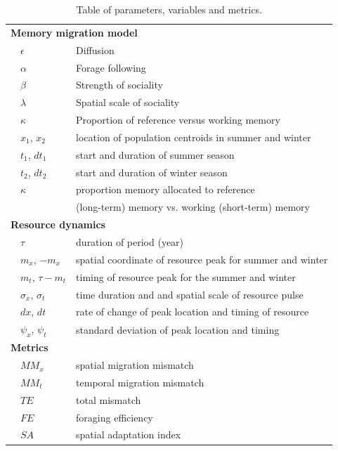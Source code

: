 \documentclass[12pt]{article}
\begin{document}
\begin{table}[b!]
	\caption{\label{tab_defs} Table of parameters, variables and metrics.}
	
	\centering
	\begin{tabular}{ll|l}
		\hline\hline
		\multicolumn{3}{l}{\textbf{Memory migration model}}\\ 
		& $\epsilon$ & Diffusion \\ 
		& $\alpha$ & Forage following \\ 
		& $\beta$ & Strength of sociality \\ 
		& $\lambda$ & Spatial scale of sociality \\ 
		& $\kappa$ & Proportion of reference versus working memory \\ 
		& $x_1$, $x_2$ & location of population centroids in summer and winter \\ 
		& $t_1$, $dt_1$ & start and duration of summer season \\ 
		& $t_2$, $dt_2$ & start and duration of winter season \\ 
		& $\kappa$ & proportion memory allocated to reference \\
		&& (long-term) memory vs. working (short-term) memory \\ 
		\multicolumn{3}{l}{\textbf{Resource dynamics}} \\ 
		& $\tau$ & duration of period (year) \\ 
		& $m_x$, $-m_x$ & spatial coordinate of resource peak for summer and winter \\ 
		& $m_t$, $\tau - m_t$ & timing of resource peak for the summer and winter \\ 
		& $\sigma_x$, $\sigma_t$ & time duration and and spatial scale of resource pulse \\ 
		& $dx$, $dt$ & rate of change of peak location and timing of resource \\ 
		& $\psi_x$, $\psi_t$ & standard deviation of peak location and timing \\ 
		\multicolumn{3}{l}{\textbf{Metrics}}\\ 
		& $MM_x$ & spatial migration mismatch \\ 
		& $MM_t$ & temporal migration mismatch \\ 
		& $TE$ & total mismatch \\ 
		& $FE$ & foraging efficiency \\ 
		& $SA$ & spatial adaptation index \\ 
		\hline\hline
	\end{tabular}
\end{table}
\end{document}
